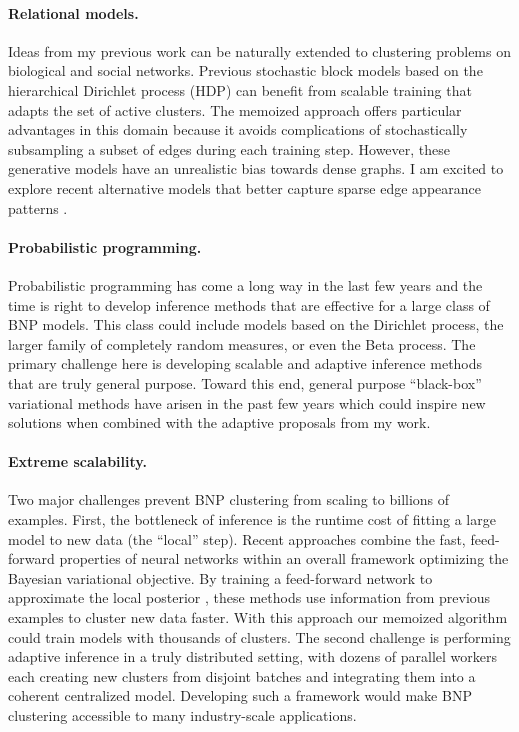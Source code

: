 \documentclass[11pt,letterpaper,sans]{article}
\begin{document}
\paragraph{Relational models.}
Ideas from my previous work can be naturally extended to clustering problems on biological and social networks. Previous stochastic block models based on the hierarchical Dirichlet process (HDP) \cite{airoldi2009mmsb, kim2013hdpaMMSB} can benefit from scalable training that adapts the set of active clusters. The memoized approach offers particular advantages in this domain because it avoids complications of stochastically subsampling a subset of edges during each training step.
 However, these generative models have an unrealistic bias towards dense graphs.
 I am excited to explore recent alternative models that better capture sparse edge appearance patterns \cite{broderick:sparseEdgeExchangeable}.

\paragraph{Probabilistic programming.}
Probabilistic programming has come a long way in the last few years and the time is right to develop inference methods that are effective for a large class of BNP models. This class could include models based on the Dirichlet process, the larger family of completely random measures, or even the Beta process. The primary challenge here is developing scalable and adaptive inference methods that are truly general purpose. Toward this end, general purpose ``black-box'' variational methods \cite{kucukelbir:Stan, ranganath:blackbox} have arisen in the past few years which could inspire new solutions when combined with the adaptive proposals from my work.

\paragraph{Extreme scalability.}
Two major challenges prevent BNP clustering from scaling to billions of examples. First, the bottleneck of inference is the runtime cost of fitting a large model to new data (the ``local'' step). Recent approaches  \cite{mnih:neuralVariational} combine the fast, feed-forward properties of neural networks within an overall framework optimizing the Bayesian variational objective. By training a feed-forward network to approximate the local posterior \cite{gan:deepTSBN}, these methods use information from previous examples to cluster new data faster. With this approach our memoized algorithm could train models with thousands of clusters. The second challenge is performing adaptive inference in a truly distributed setting, with dozens of parallel workers each creating new clusters from disjoint batches and integrating them into a coherent centralized model. Developing such a framework would make BNP clustering accessible to many industry-scale applications.
\end{document}
